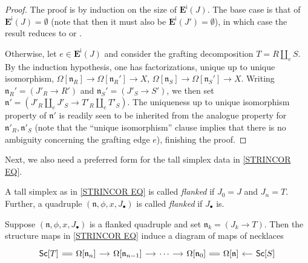 \documentclass{hha}
\theoremstyle{definition} %
\begin{document}
\begin{proof}
	The proof is by induction on the size of 
	$\boldsymbol{E}^{\mathsf{i}}(J)$.
	The base case is that of $\boldsymbol{E}^{\mathsf{i}}(J) = \emptyset$
	(note that then it must also be $\boldsymbol{E}^{\mathsf{i}}(J') = \emptyset$),
	in which case the result reduces to 
	\cite[Prop. 6.9]{CM11} or
	\cite[Prop. 5.62]{Per18}.

	Otherwise, let $e \in \boldsymbol{E}^{\mathsf{i}}(J)$
	and consider the grafting decomposition
	$T = R \amalg_e S$.
	By the induction hypothesis, 
	one has factorizations, unique up to unique isomorphism,
	$\Omega[\mathfrak{n}_{R}] \to \Omega[\mathfrak{n}_R'] \to X$,
	$\Omega[\mathfrak{n}_S] \to \Omega[\mathfrak{n}_{S}'] \to X$.
	Writing 
	$\mathfrak{n}_R' = (J'_R \to R')$
	and 
	$\mathfrak{n}_S' = (J'_S \to S')$,
	we then set
	$\mathfrak{n}'= \left(
	J'_R \amalg_e J'_S \to T'_R \amalg_e T'_S
	\right)$.
	The uniqueness up to unique isomorphism property of
	$\mathfrak{n}'$ is readily seen to be inherited from 
	the analogue property for 
	$\mathfrak{n}'_R,\mathfrak{n}'_S$
	(note that the ``unique isomorphism'' clause
	implies that there is no ambiguity concerning the grafting edge $e$),
	finishing the proof.
\end{proof}


Next, we also need a preferred form for the tall simplex data in \eqref{STRINCOR EQ}.


\begin{definition}[{cf. \cite[\S 4]{DS11}}]
        \label{FLANKED_DEF}
	A tall simplex as in 
	\eqref{STRINCOR EQ}
	is called \emph{flanked}
	if $J_0 = J$
	and $J_n = T$.
%	
	Further, a quadruple
	$(\mathfrak{n},\phi,x,J_{\bullet})$
	is called \emph{flanked} if $J_{\bullet}$ is.
\end{definition}



\begin{remark}
	Suppose $(\mathfrak{n},\phi,x,J_{\bullet})$
	is a flanked quadruple
	and set $\mathfrak{n}_k = (J_k \to T)$.
	Then the structure maps in \eqref{STRINCOR EQ}
	induce a diagram of maps of necklaces
\begin{equation}
\begin{tikzcd}[column sep=12pt]
	\mathsf{Sc}[T]
	\ar[equal]{r} 
&
	\Omega[\mathfrak{n}_n]
	\ar{r}
&
	\Omega[\mathfrak{n}_{n-1}]
	\ar{r}
&
	\cdots
	\ar{r}
&
	\Omega[\mathfrak{n}_0]
	\ar[equal]{r}
&
	\Omega[\mathfrak{n}]
&
	\mathsf{Sc}[S]
	\ar{l}
\end{tikzcd}
\end{equation} 
\end{remark}
\end{document}
